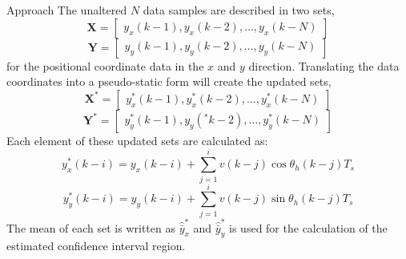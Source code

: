 \begin{section}{Approach}
The unaltered $N$ data samples are described in two sets,
\begin{equation}
    \mathcal{\bm{X}}=\begin{bmatrix} y_x(k-1) ,y_x(k-2),\dots,y_x(k-N) \end{bmatrix} \nonumber
\end{equation}
\begin{equation}
    \mathcal{\bm{Y}}=\begin{bmatrix} y_y(k-1) ,y_y(k-2),\dots,y_y(k-N) \end{bmatrix} \nonumber
\end{equation}
for the positional coordinate data in the $x$ and $y$ direction. Translating the data coordinates into a pseudo-static form will create the updated sets,
\begin{equation}
    \mathcal{\bm{X}}^*=\begin{bmatrix} y_x^*(k-1) ,y_x^*(k-2),\dots,y_x^*(k-N) \end{bmatrix} \nonumber
\end{equation}
\begin{equation}
    \mathcal{\bm{Y}}^*=\begin{bmatrix} y_y^*(k-1) ,y_y(^*k-2),\dots,y_y^*(k-N) \end{bmatrix} \nonumber
\end{equation}
Each element of these updated sets are calculated as:
    \begin{equation}
	y_x^*(k-i) = y_x(k-i)+\sum_{j=1}^i v(k-j)\cos{\theta_h(k-j)T_s}
	\end{equation}
	\begin{equation}
	y_y^*(k-i) = y_y(k-i)+\sum_{j=1}^i v(k-j)\sin{\theta_h(k-j)T_s}
	\end{equation}
The mean of each set is written as $\hat{\bar{y}}_x^*$ and $\hat{\bar{y}}_y^*$ is used for the calculation of the estimated confidence interval region.


\end{section}
